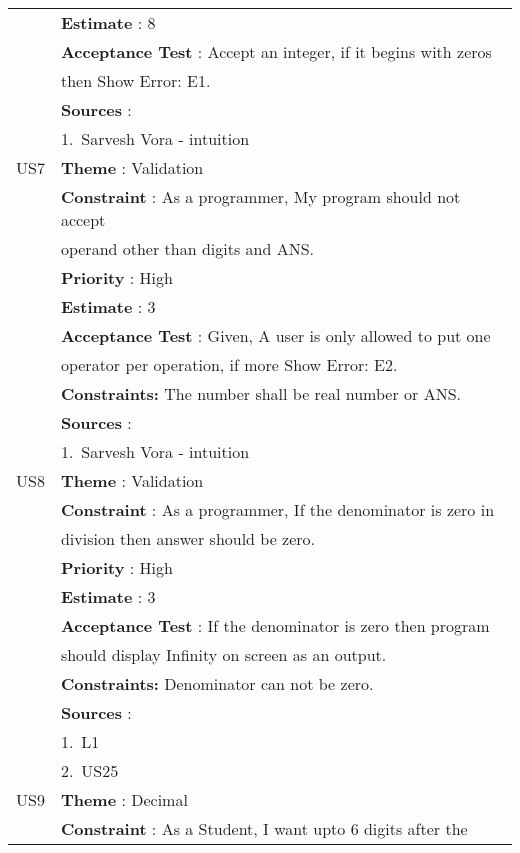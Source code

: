 \documentclass{article}
\begin{document}
\begin{longtable}{|| c || l ||}
         & \textbf{Estimate} : 8 \\
         & \textbf{Acceptance Test} : Accept an integer, if it begins with zeros \\
         & then Show Error: E1.\\
         & \textbf{Sources} : \\
         & 1.~Sarvesh Vora - intuition \\
         \hline
         US7 & \textbf{Theme} : Validation \\
         & \textbf{Constraint} : As a programmer, My program should not accept \\ 
         & operand other than digits and ANS. \\
         & \textbf{Priority} : High \\
         & \textbf{Estimate} : 3 \\
         & \textbf{Acceptance Test} : Given, A user is only allowed to put one \\
         & operator per operation, if more Show Error: E2.\\
         & \textbf{Constraints: } The number shall be real number or ANS.\\
         & \textbf{Sources} : \\
         & 1.~Sarvesh Vora - intuition \\
         \hline
         US8 & \textbf{Theme} : Validation \\
         & \textbf{Constraint} : As a programmer, If the denominator is zero in \\ 
         & division then answer should be zero.\\
         & \textbf{Priority} : High \\
         & \textbf{Estimate} : 3 \\
         & \textbf{Acceptance Test} : If the denominator is zero then program \\ 
         & should display Infinity on screen as an output.\\
         & \textbf{Constraints: } Denominator can not be zero.\\
         & \textbf{Sources} : \\
         & 1.~L1 \\
         & 2.~US25 \\
         \hline
         \newpage
         \hline
         US9 & \textbf{Theme} : Decimal \\
         & \textbf{Constraint} : As a Student, I want upto 6 digits after the \\ 

\end{longtable}
\end{document}

